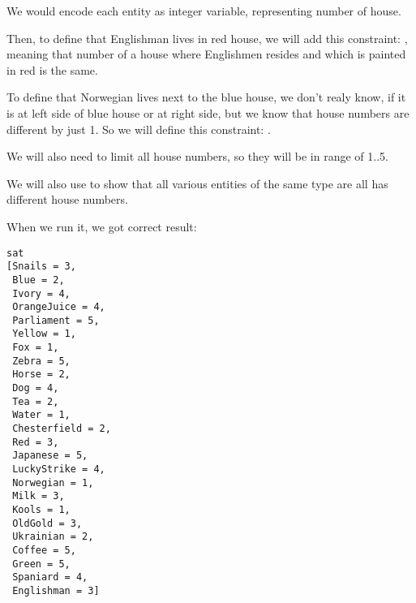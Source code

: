 We would encode each entity as integer variable, representing number of house.

Then, to define that Englishman lives in red house, we will add this constraint: , meaning that number of a house where Englishmen resides and which is painted in red is the same.

To define that Norwegian lives next to the blue house, we don't realy know, if it is at left side of blue house or at right side, but we know that house numbers are different by just 1.
So we will define this constraint: .

We will also need to limit all house numbers, so they will be in range of 1..5.

We will also use  to show that all various entities of the same type are all has different house numbers.



When we run it, we got correct result:

\begin{lstlisting}
sat
[Snails = 3,
 Blue = 2,
 Ivory = 4,
 OrangeJuice = 4,
 Parliament = 5,
 Yellow = 1,
 Fox = 1,
 Zebra = 5,
 Horse = 2,
 Dog = 4,
 Tea = 2,
 Water = 1,
 Chesterfield = 2,
 Red = 3,
 Japanese = 5,
 LuckyStrike = 4,
 Norwegian = 1,
 Milk = 3,
 Kools = 1,
 OldGold = 3,
 Ukrainian = 2,
 Coffee = 5,
 Green = 5,
 Spaniard = 4,
 Englishman = 3]
 \end{lstlisting}

